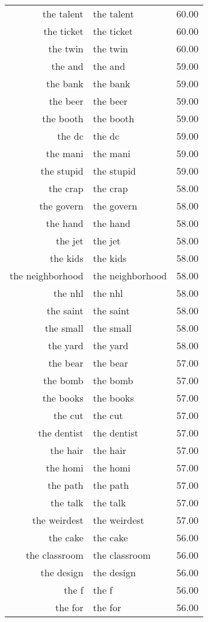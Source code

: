 \begin{table}[ht]
\begin{tabular}{rlr}
  the talent & the talent & 60.00 \\ 
  the ticket & the ticket & 60.00 \\ 
  the twin & the twin & 60.00 \\ 
  the and & the and & 59.00 \\ 
  the bank & the bank & 59.00 \\ 
  the beer & the beer & 59.00 \\ 
  the booth & the booth & 59.00 \\ 
  the dc & the dc & 59.00 \\ 
  the mani & the mani & 59.00 \\ 
  the stupid & the stupid & 59.00 \\ 
  the crap & the crap & 58.00 \\ 
  the govern & the govern & 58.00 \\ 
  the hand & the hand & 58.00 \\ 
  the jet & the jet & 58.00 \\ 
  the kids & the kids & 58.00 \\ 
  the neighborhood & the neighborhood & 58.00 \\ 
  the nhl & the nhl & 58.00 \\ 
  the saint & the saint & 58.00 \\ 
  the small & the small & 58.00 \\ 
  the yard & the yard & 58.00 \\ 
  the bear & the bear & 57.00 \\ 
  the bomb & the bomb & 57.00 \\ 
  the books & the books & 57.00 \\ 
  the cut & the cut & 57.00 \\ 
  the dentist & the dentist & 57.00 \\ 
  the hair & the hair & 57.00 \\ 
  the homi & the homi & 57.00 \\ 
  the path & the path & 57.00 \\ 
  the talk & the talk & 57.00 \\ 
  the weirdest & the weirdest & 57.00 \\ 
  the cake & the cake & 56.00 \\ 
  the classroom & the classroom & 56.00 \\ 
  the design & the design & 56.00 \\ 
  the f & the f & 56.00 \\ 
  the for & the for & 56.00 \\ 

\end{tabular}
\end{table}
